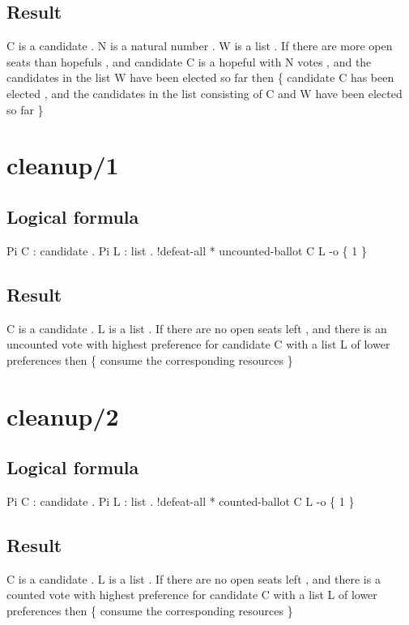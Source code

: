 \subsection{Result}
\begin{texto2}
	C is a candidate . N is a natural number . W is a list . If there are more open seats than hopefuls , and candidate C is a hopeful with N votes , and the candidates in the list W have been elected so far then \{ candidate C has been elected , and the candidates in the list consisting of C and W have been elected so far \}
\end{texto2}

\section{cleanup/1}
\subsection{Logical formula}
\begin{texto2}
	Pi C : candidate . Pi L : list . !defeat-all * uncounted-ballot C L -o \{ 1 \}
\end{texto2}

\subsection{Result}
\begin{texto2}
	C is a candidate . L is a list . If there are no open seats left , and there is an uncounted vote with highest preference for candidate C with a list L of lower preferences then \{ consume the corresponding resources \}
\end{texto2}

\section{cleanup/2}
\subsection{Logical formula}
\begin{texto2}
	Pi C : candidate . Pi L : list . !defeat-all * counted-ballot C L -o \{ 1 \}
\end{texto2}

\subsection{Result}
\begin{texto2}
	C is a candidate . L is a list . If there are no open seats left , and there is a counted vote with highest preference for candidate C with a list L of lower preferences then \{ consume the corresponding resources \}
\end{texto2}

